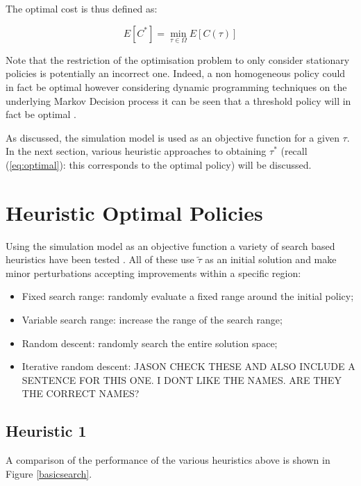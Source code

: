\documentclass[12pt]{article}
\begin{document}
The optimal cost is thus defined as:

\begin{equation}\label{eq:optimal}
E[C^*]=\min_{\tau\in\Omega}E[C(\tau)]
\end{equation}

Note that the restriction of the optimisation problem to only consider stationary policies is potentially an incorrect one.
Indeed, a non homogeneous policy could in fact be optimal however considering dynamic programming techniques on the underlying Markov Decision process it can be seen that a threshold policy will in fact be optimal \cite{puterman2009markov}.

As discussed, the simulation model is used as an objective function for a given $\tau$.
In the next section, various heuristic approaches to obtaining $\tau^*$ (recall (\ref{eq:optimal}): this corresponds to the optimal policy) will be discussed.

\section{Heuristic Optimal Policies}\label{heuristicoptimalpolicies}

Using the simulation model as an objective function a variety of search based heuristics have been tested \cite{}. All of these use $\tilde\tau$ as an initial solution and make minor perturbations accepting improvements within a specific region:

\begin{itemize}
    \item Fixed search range: randomly evaluate a fixed range around the initial policy;
    \item Variable search range: increase the range of the search range;
    \item Random descent: randomly search the entire solution space;
    \item Iterative random descent: JASON CHECK THESE AND ALSO INCLUDE A SENTENCE FOR THIS ONE. I DONT LIKE THE NAMES. ARE THEY THE CORRECT NAMES?
\end{itemize}

\subsection{Heuristic 1}\label{heuristic1}

A comparison of the performance of the various heuristics above is shown in Figure \ref{basicsearch}.
\end{document}

